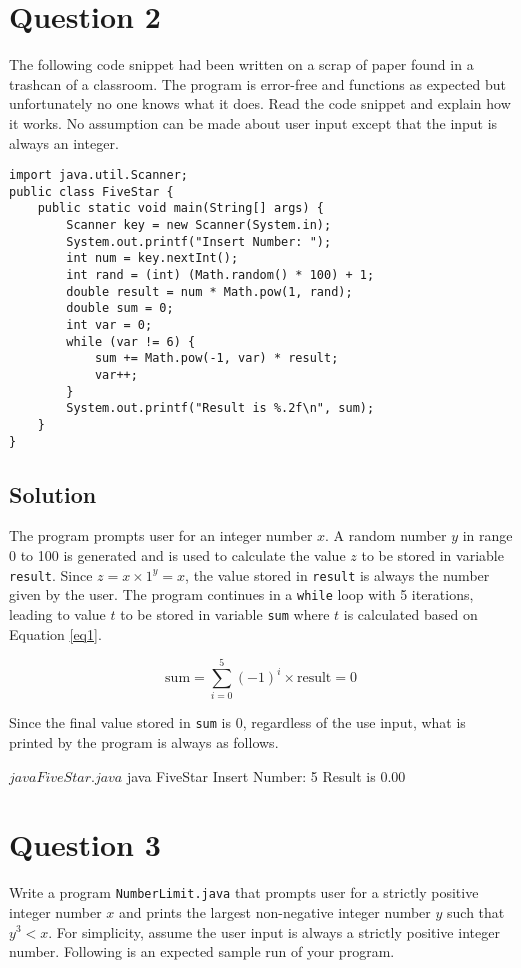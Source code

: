 \section*{Question 2}
The following code snippet had been written on a scrap of paper found in a trashcan of a classroom.
The program is error-free and functions as expected but unfortunately no one knows what it does.
Read the code snippet and explain how it works.
No assumption can be made about user input except that the input is always an integer.

\begin{lstlisting}
import java.util.Scanner;
public class FiveStar {
	public static void main(String[] args) {
		Scanner key = new Scanner(System.in);
		System.out.printf("Insert Number: ");
		int num = key.nextInt();
		int rand = (int) (Math.random() * 100) + 1;
		double result = num * Math.pow(1, rand);
		double sum = 0;
		int var = 0;
		while (var != 6) {
			sum += Math.pow(-1, var) * result;
			var++;
		}
		System.out.printf("Result is %.2f\n", sum);
	}
}
\end{lstlisting}

\subsection*{Solution}

The program prompts user for an integer number $x$.
A random number $y$ in range 0 to 100 is generated and is used to calculate the value $z$ to be stored in variable \texttt{result}.
Since $z = x \times 1^{y} = x$, the value stored in \texttt{result} is always the number given by the user.
The program continues in a \texttt{while} loop with 5 iterations, leading to value $t$ to be stored in variable \texttt{sum} where $t$ is calculated based on Equation \ref{eq1}.

\begin{equation}
\text{sum} = \sum\limits_{i=0}^5 (-1)^i \times \text{result} = 0
\label{eq1}
\end{equation}

Since the final value stored in \texttt{sum} is $0$, regardless of the use input, what is printed by the program is always as follows.

\begin{terminal}
$ java FiveStar.java
$ java FiveStar
Insert Number: 5
Result is 0.00
\end{terminal}

\section*{Question 3}
Write a program \texttt{NumberLimit.java} that prompts user for a strictly positive integer number $x$ and prints the largest non-negative integer number $y$ such that $y^3 < x$.
For simplicity, assume the user input is always a strictly positive integer number.
Following is an expected sample run of your program.

